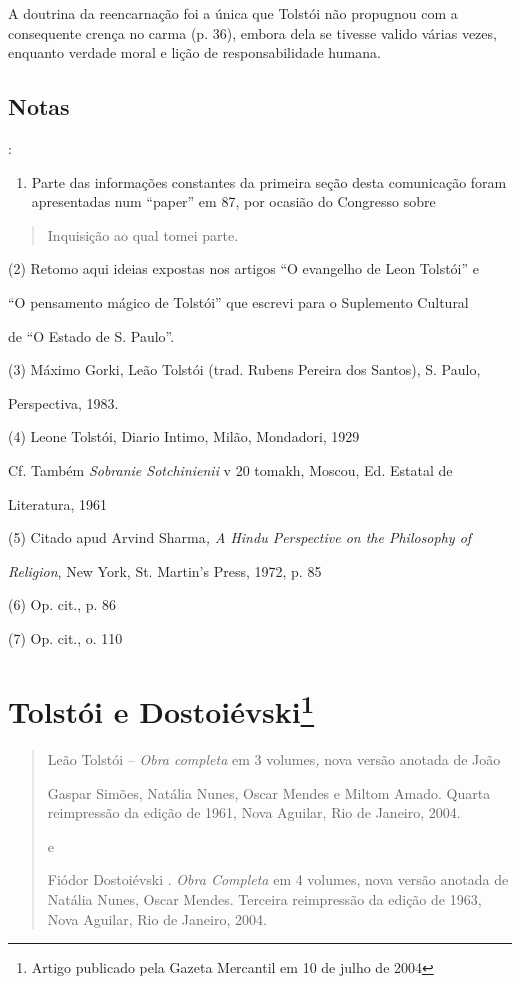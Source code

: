 A doutrina da reencarnação foi a única que Tolstói não propugnou com a
consequente crença no carma (p. 36), embora dela se tivesse valido
várias vezes, enquanto verdade moral e lição de responsabilidade humana.

\section{{Notas}}:

\begin{enumerate}
\def\labelenumi{(\arabic{enumi})}
\item
  Parte das informações constantes da primeira seção desta comunicação
  foram apresentadas num ``paper'' em 87, por ocasião do Congresso sobre
\end{enumerate}

\begin{quote}
Inquisição ao qual tomei parte.
\end{quote}

(2) Retomo aqui ideias expostas nos artigos ``O evangelho de Leon
Tolstói'' e

``O pensamento mágico de Tolstói'' que escrevi para o Suplemento
Cultural

de ``O Estado de S. Paulo''.

(3) Máximo Gorki, Leão Tolstói (trad. Rubens Pereira dos Santos), S.
Paulo,

Perspectiva, 1983.

(4) Leone Tolstói, Diario Intimo, Milão, Mondadori, 1929

Cf. Também \emph{Sobranie Sotchinienii} v 20 tomakh, Moscou, Ed. Estatal
de

Literatura, 1961

(5) Citado apud Arvind Sharma\emph{, A Hindu Perspective on the
Philosophy of }

\emph{Religion}, New York, St. Martin's Press, 1972, p. 85

(6) Op. cit., p. 86

(7) Op. cit., o. 110

\chapter{Tolstói e Dostoiévski\footnote{Artigo publicado pela Gazeta
  Mercantil em 10 de julho de 2004}}

\begin{quote}
Leão Tolstói -- \emph{Obra completa} em 3 volumes\emph{,} nova versão
anotada de João

Gaspar Simões, Natália Nunes, Oscar Mendes e Miltom Amado. Quarta
reimpressão da  edição de 1961, Nova Aguilar, Rio de Janeiro, 2004.

e

Fiódor Dostoiévski . \emph{Obra Completa} em 4 volumes, nova versão
anotada de Natália Nunes, Oscar Mendes. Terceira reimpressão da  edição
de 1963, Nova Aguilar, Rio de Janeiro, 2004.
\end{quote}

